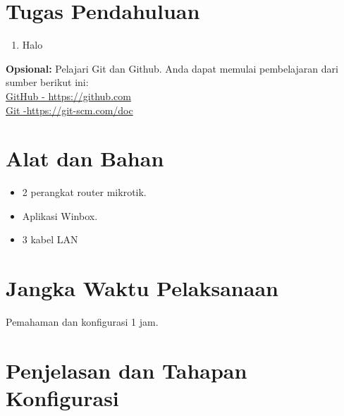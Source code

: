 \section{Tugas Pendahuluan}
\begin{enumerate}
	\item Halo
\end{enumerate}

\begin{center}
	\colorbox{cyan!30}{\parbox{0.8\linewidth}{\textbf{Opsional:} Pelajari Git dan Github. Anda dapat memulai pembelajaran dari sumber berikut ini: \\ \href{https://github.com}{GitHub - https://github.com} \\ \href{https://git-scm.com/doc}{Git -https://git-scm.com/doc}}}
\end{center}

\section{Alat dan Bahan}
\begin{itemize}[label=$\bullet$, itemsep=-1pt, leftmargin=*]
	\item 2 perangkat router mikrotik.
	\item Aplikasi Winbox.
	\item 3 kabel LAN
\end{itemize}

\section{Jangka Waktu Pelaksanaan}
Pemahaman dan konfigurasi 1 jam.

\section{Penjelasan dan Tahapan Konfigurasi}

